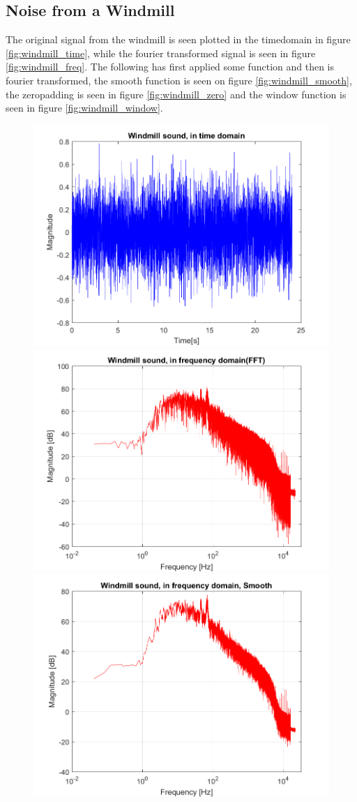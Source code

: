 \subsection{Noise from a Windmill}

The original signal from the windmill is seen plotted in the timedomain in figure \ref{fig:windmill_time}, while the fourier transformed signal is seen in figure \ref{fig:windmill_freq}. The following has first applied some function and then is fourier transformed, the smooth function is seen on figure \ref{fig:windmill_smooth}, the zeropadding is seen in figure \ref{fig:windmill_zero} and the window function is seen in figure \ref{fig:windmill_window}.

\begin{figure}[htb!]
	\centering
	{\includegraphics[width=0.45\linewidth]{code/Windmill_figure1.png}}
	{\includegraphics[width=0.45\linewidth]{code/Windmill_figure2.png}}
	{\includegraphics[width=0.45\linewidth]{code/Windmill_figure3.png}}

\end{figure}
